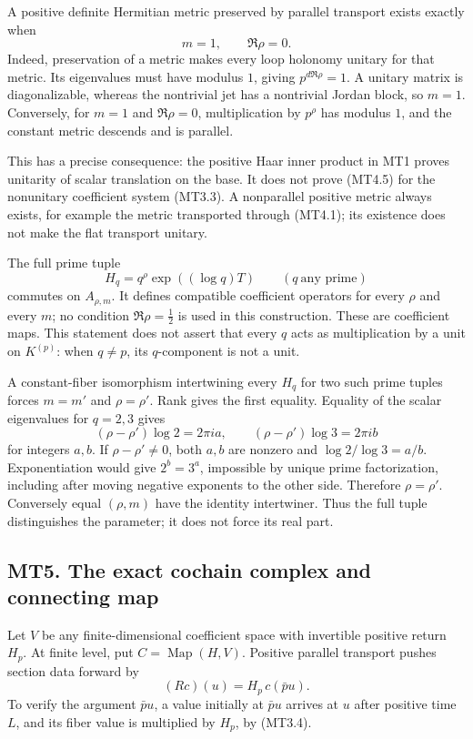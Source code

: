 A positive definite Hermitian metric preserved by parallel transport
exists exactly when \[
 m=1,\qquad\Re\rho=0.
\tag{MT4.5}
\] Indeed, preservation of a metric makes every loop holonomy unitary
for that metric. Its eigenvalues must have modulus \(1\), giving
\(p^{d\Re\rho}=1\). A unitary matrix is diagonalizable, whereas the
nontrivial jet has a nontrivial Jordan block, so \(m=1\). Conversely,
for \(m=1\) and \(\Re\rho=0\), multiplication by \(p^\rho\) has modulus
\(1\), and the constant metric descends and is parallel.

This has a precise consequence: the positive Haar inner product in MT1
proves unitarity of scalar translation on the base. It does not prove
(MT4.5) for the nonunitary coefficient system (MT3.3). A nonparallel
positive metric always exists, for example the metric transported
through (MT4.1); its existence does not make the flat transport unitary.

The full prime tuple \[
 H_q=q^\rho\exp((\log q)T)\qquad(q\ \text{any prime})
\tag{MT4.6}
\] commutes on \(A_{\rho,m}\). It defines compatible coefficient
operators for every \(\rho\) and every \(m\); no condition
\(\Re\rho=\tfrac12\) is used in this construction. These are coefficient
maps. This statement does not assert that every \(q\) acts as
multiplication by a unit on \(K^{(p)}\): when \(q\ne p\), its
\(q\)-component is not a unit.

A constant-fiber isomorphism intertwining every \(H_q\) for two such
prime tuples forces \(m=m'\) and \(\rho=\rho'\). Rank gives the first
equality. Equality of the scalar eigenvalues for \(q=2,3\) gives \[
 (\rho-\rho')\log2=2\pi i a,\qquad
 (\rho-\rho')\log3=2\pi i b
\] for integers \(a,b\). If \(\rho-\rho'\ne0\), both \(a,b\) are nonzero
and \(\log2/\log3=a/b\). Exponentiation would give \(2^b=3^a\),
impossible by unique prime factorization, including after moving
negative exponents to the other side. Therefore \(\rho=\rho'\).
Conversely equal \((\rho,m)\) have the identity intertwiner. Thus the
full tuple distinguishes the parameter; it does not force its real part.

\subsection{MT5. The exact cochain complex and connecting
map}\label{mt5.-the-exact-cochain-complex-and-connecting-map}

Let \(V\) be any finite-dimensional coefficient space with invertible
positive return \(H_p\). At finite level, put
\(C=\operatorname{Map}(H,V)\). Positive parallel transport pushes
section data forward by \[
 (Rc)(u)=H_p\,c(\bar p u).
\tag{MT5.1}
\] To verify the argument \(\bar p u\), a value initially at
\(\bar p u\) arrives at \(u\) after positive time \(L\), and its fiber
value is multiplied by \(H_p\), by (MT3.4).

